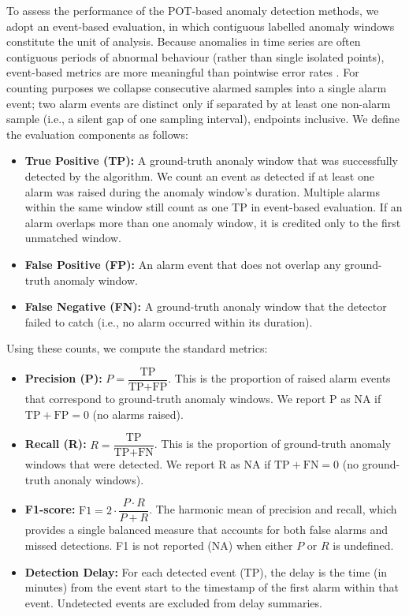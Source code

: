 \documentclass{statsmsc}
\begin{document}
To assess the performance of the POT-based anomaly detection methods, 
we adopt an event-based evaluation, in which contiguous labelled anomaly windows constitute the unit of analysis.
Because anomalies in time series are often contiguous periods of abnormal behaviour (rather than single isolated points), 
event-based metrics are more meaningful than pointwise error rates \citep{lavin2015evaluating}. For counting purposes we collapse 
consecutive alarmed samples into a single alarm event; two alarm events are distinct only if separated by at 
least one non-alarm sample (i.e., a silent gap of one sampling interval), endpoints inclusive. 
We define the evaluation components as follows:

\begin{itemize}
    \item \textbf{True Positive (TP):} 
    A ground-truth anonaly window that was successfully detected by the algorithm. 
    We count an event as detected if at least one alarm was raised during the anomaly window’s duration. 
    Multiple alarms within the same window still count as one TP in event-based evaluation.
    If an alarm overlaps more than one anomaly window, it is credited only to the first unmatched window.
    
    \item \textbf{False Positive (FP):} 
    An alarm event that does not overlap any ground-truth anomaly window. 
    
    \item \textbf{False Negative (FN):} 
    A ground-truth anonaly window that the detector failed to catch (i.e., no alarm occurred within its duration).
\end{itemize}

Using these counts, we compute the standard metrics:
\begin{itemize}
    \item \textbf{Precision (P):}
    \( P = \dfrac{\text{TP}}{\text{TP} + \text{FP}} \). This is the proportion of raised alarm events 
    that correspond to ground-truth anomaly windows. 
    We report P as NA if \( \text{TP}+\text{FP}=0 \) (no alarms raised).

    \item \textbf{Recall (R):}
    \( R = \dfrac{\text{TP}}{\text{TP} + \text{FN}} \). This is the proportion of ground-truth anomaly windows
    that were detected. We report R as NA if \( \text{TP}+\text{FN}=0 \) 
    (no ground-truth anonaly windows).

    \item \textbf{F1-score:}
    \( \text{F1} = 2 \cdot \dfrac{P \cdot R}{P + R} \). The harmonic mean of precision and recall, which 
    provides a single balanced measure that accounts for both false alarms and missed detections.
    F1 is not reported (NA) when either \( P \) or \( R \) is undefined.

    \item \textbf{Detection Delay:}
    For each detected event (TP), the delay is the time (in minutes) from the event start to the timestamp of 
    the first alarm within that event. Undetected events are excluded from delay summaries.
\end{itemize}
\end{document}
